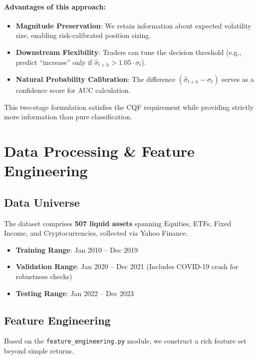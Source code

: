 \documentclass[11pt, a4paper]{article}
\begin{document}
\paragraph{Advantages of this approach:}
\begin{itemize}
    \item \textbf{Magnitude Preservation}: We retain information about 
    expected volatility size, enabling risk-calibrated position sizing.
    \item \textbf{Downstream Flexibility}: Traders can tune the decision 
    threshold (e.g., predict ``increase'' only if 
    $\hat{\sigma}_{t+h} > 1.05 \cdot \sigma_t$).
    \item \textbf{Natural Probability Calibration}: The difference 
    $(\hat{\sigma}_{t+h} - \sigma_t)$ serves as a confidence score for AUC calculation.
\end{itemize}
This two-stage formulation satisfies the CQF requirement while providing 
strictly more information than pure classification.

\section{Data Processing \& Feature Engineering}

\subsection{Data Universe}
The dataset comprises \textbf{507 liquid assets} spanning Equities, ETFs, Fixed Income, and Cryptocurrencies, collected via Yahoo Finance.
\begin{itemize}
    \item \textbf{Training Range}: Jan 2010 -- Dec 2019
    \item \textbf{Validation Range}: Jan 2020 -- Dec 2021 (Includes COVID-19 crash for robustness checks)
    \item \textbf{Testing Range}: Jan 2022 -- Dec 2023
\end{itemize}

\subsection{Feature Engineering}
Based on the \texttt{feature\_engineering.py} module, we construct a rich feature set beyond simple returns.
\end{document}
